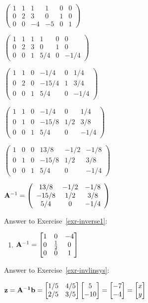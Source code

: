 \documentclass[
  letterpaper,
]{book}
\providecommand{\tightlist}{%
  \setlength{\itemsep}{0pt}\setlength{\parskip}{0pt}}\usepackage{longtable,booktabs,array}
\theoremstyle{definition}
\theoremstyle{definition}
\theoremstyle{plain}
\theoremstyle{definition}
\theoremstyle{plain}
\theoremstyle{plain}
\theoremstyle{remark}
\begin{document}
\(\left(\begin{array}{ccc|ccc}  1&1&1 &1 &0&0\\  0&2&3 &0 &1&0\\  0&0&-4&-5&0&1 \end{array} \right)\)

\(\left(\begin{array}{ccc|ccc}  1&1&1&1 &0&0\\  0&2&3&0 &1&0\\  0&0&1&5/4&0&-1/4 \end{array} \right)\)

\(\left(\begin{array}{ccc|ccc}  1&1&0&-1/4 &0&1/4\\  0&2&0&-15/4&1&3/4\\  0&0&1&5/4 &0&-1/4 \end{array} \right)\)

\(\left(\begin{array}{ccc|ccc}  1&1&0&-1/4 &0 &1/4\\  0&1&0&-15/8&1/2&3/8\\  0&0&1&5/4 &0 &-1/4 \end{array} \right)\)

\(\left(\begin{array}{ccc|ccc}  1&0&0&13/8 &-1/2&-1/8\\  0&1&0&-15/8&1/2 &3/8\\  0&0&1&5/4 &0 &-1/4 \end{array} \right)\)

\({\bf A}^{-1} = \left(\begin{array}{ccc}  13/8 &-1/2&-1/8\\  -15/8&1/2 &3/8\\  5/4 &0 &-1/4 \end{array} \right)\)

Answer to Exercise~\ref{exr-inverse1}:

\begin{enumerate}
\def\labelenumi{\arabic{enumi}.}
\tightlist
\item
  \({\bf A}^{-1}=\begin{bmatrix} 1&0&-4\\0&\frac{1}{2}&0\\0&0&1 \end{bmatrix}\)
\end{enumerate}

Answer to Exercise~\ref{exr-invlinsys}:

\(\textbf{z} = \bf{A}^{-1} \bf{b} = \begin{bmatrix}  1/5 &4/5\\  2/5&3/5 \end{bmatrix} \begin{bmatrix}  5 \\  -10 \end{bmatrix}= \begin{bmatrix}  -7 \\  -4 \end{bmatrix} = \begin{bmatrix}  x \\  y \end{bmatrix}\)
\end{document}
